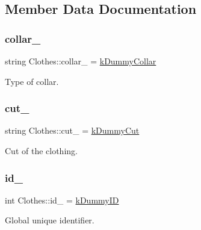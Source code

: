 \subsection{Member Data Documentation}
\mbox{\label{classClothes_ae2e5026257b3a2f2ddbf61757fd3b57b}} 
\subsubsection{\texorpdfstring{collar\+\_\+}{collar\_}}
{\footnotesize\ttfamily string Clothes\+::collar\+\_\+ = \mbox{\hyperlink{clothes_8h_ac06c9f556f68bcd2829e36c55b70a86e}{k\+Dummy\+Collar}}\hspace{0.3cm}{\ttfamily [protected]}}



Type of collar. 

\mbox{\label{classClothes_ac1c2286c8928a5eee91d818a098a44ac}} 
\subsubsection{\texorpdfstring{cut\+\_\+}{cut\_}}
{\footnotesize\ttfamily string Clothes\+::cut\+\_\+ = \mbox{\hyperlink{clothes_8h_a8a6eb066049b009439505355aeaae375}{k\+Dummy\+Cut}}\hspace{0.3cm}{\ttfamily [protected]}}



Cut of the clothing. 

\mbox{\label{classClothes_a8978d931db5ca47c3ccea30def4ae83e}} 
\subsubsection{\texorpdfstring{id\+\_\+}{id\_}}
{\footnotesize\ttfamily int Clothes\+::id\+\_\+ = \mbox{\hyperlink{clothes_8h_a77186917343a417a2369cdff0bc86d31}{k\+Dummy\+ID}}\hspace{0.3cm}{\ttfamily [protected]}}



Global unique identifier. 

\mbox{\label{classClothes_ae02603eda727e33caf46ec30e761e3c3}} 

